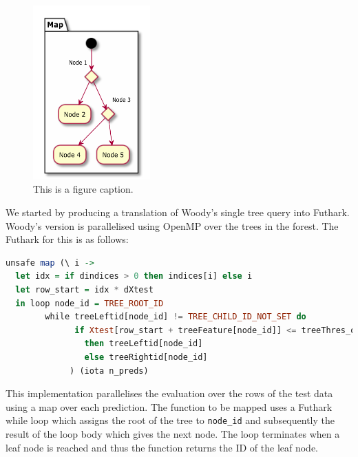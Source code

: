 \documentclass[a4paper]{article}
\begin{document}
\begin{figure}
\centering
\includegraphics[width=0.4\textwidth]{tree_basic.pdf}
\caption{\label{fig:frog1}This is a figure caption.}
\end{figure}
    
We started by producing a translation of Woody's single tree query into Futhark. Woody's version is parallelised using OpenMP over the trees in the forest. The Futhark for this is as follows:

\vspace{1ex}
\begin{lrbox}{\lstbox}
\begin{minipage}{\textwidth}
\begin{lstlisting}[language=Haskell, breaklines]
  unsafe map (\ i ->
  let idx = if dindices > 0 then indices[i] else i
  let row_start = idx * dXtest
  in loop node_id = TREE_ROOT_ID
        while treeLeftid[node_id] != TREE_CHILD_ID_NOT_SET do
              if Xtest[row_start + treeFeature[node_id]] <= treeThres_or_leaf[node_id]
                then treeLeftid[node_id]
                else treeRightid[node_id]
             ) (iota n_preds)
\end{lstlisting}
\end{minipage}
\end{lrbox}  
\vspace{1ex}

\colorbox{lightgray}{\usebox\lstbox}

This implementation parallelises the evaluation over the rows of the test data using a map over each prediction. The function to be mapped uses a Futhark while loop which assigns the root of the tree to \texttt{node\_id} and subsequently the result of the loop body which gives the next node. The loop terminates when a leaf node is reached and thus the function returns the ID of the leaf node.
\end{document}
